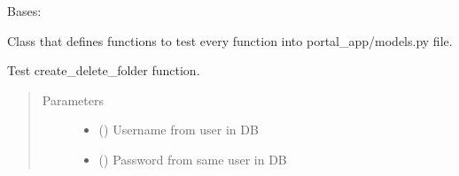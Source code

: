 \documentclass[letterpaper,10pt,english]{sphinxmanual}
\begin{document}
\begin{fulllineitems}
\label{\detokenize{CE_app.tests:CE_app.tests.test_user.UserTestCase}}
\sphinxAtStartPar
Bases: {\hyperref[\detokenize{CE_app.tests:CE_app.tests.BaseTestClass}]{}}

\sphinxAtStartPar
Class that defines functions to test every function into portal\_app/models.py file.

\begin{fulllineitems}
\label{\detokenize{CE_app.tests:CE_app.tests.test_user.UserTestCase.test_create_delete_folder}}
\sphinxAtStartPar
Test create\_delete\_folder function.
\begin{quote}\begin{description}
\item[{Parameters}] \leavevmode\begin{itemize}
\item {} 
\sphinxAtStartPar
{} () \textendash{} Username from user in DB

\item {} 
\sphinxAtStartPar
{} () \textendash{} Password from same user in DB

\end{itemize}

\end{description}\end{quote}

\end{fulllineitems}


\end{fulllineitems}
\end{document}
